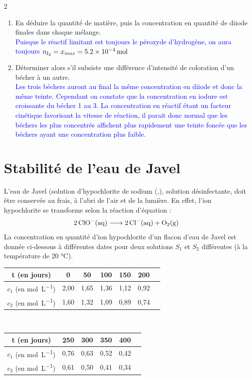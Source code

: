 \documentclass[a4paper,11pt,fleqn]{article}%
\begin{document}
\begin{multicols}{2}
\begin{enumerate}
    \textcolor{blue}{On constate que la valeur de $x_{max}$ la plus faible est toujours celle du peroxyde d'hydrogène, il sera donc le réactif limitant dans chacun des cas.}
    \item En déduire la quantité de matière, puis la concentration en quantité de diiode finales dans chaque mélange.\\
    \textcolor{blue}{Puisque le réactif limitant est toujours le péroxyde d'hydrogène, on aura toujours $n_{\ce{I2}} = x_{max} = \SI{5,2E-4}{mol}$ }
    \item Déterminer alors s'il subsiste une différence d'intensité de coloration d'un bécher à un autre.\\
    \textcolor{blue}{Les trois béchers auront au final la même concentration en diiode et donc la même teinte. Cependant on constate que la concentration en iodure est croissante du bécher 1 au 3. La concentration en réactif étant un facteur cinétique favorisant la vitesse de réaction, il parait donc normal que les béchers les plus concentrés affichent plus rapidement une teinte foncée que les béchers ayant une concentration plus faible.}
\end{enumerate}

\section{Stabilité de l'eau de Javel}
L'eau de Javel (solution d'hypochlorite de sodium (,), solution désinfectante, doit être conservée au frais, à l'abri de l'air et de la lumière. En effet, l'ion hypochlorite se transforme selon la réaction d'équation :
\begin{eqnarray}
    \ce{2ClO-(aq) -> 2Cl-(aq) + O2(g)}\nonumber
\end{eqnarray}
La concentration en quantité d'ion hypochlorite d'un flacon d'eau de Javel est donnée ci-dessous à différentes dates pour deux solutions $S_1$ et $S_2$ différentes (à la température de \num{20} \unit{\celsius}).
\\
    \begin{tabular}{|c|c|c|c|c|c|c|}
    \hline t (en jours) & 0 & 50 & 100 & 150 & 200 \\
    \hline $c_1$ (en \unit{\mole\per\liter}) & 2,00 & 1,65 & 1,36 & 1,12 & 0,92\\
    \hline $c_2$ (en \unit{\mole\per\liter}) & 1,60 & 1,32 & 1,09 & 0,89 & 0,74\\
    \hline
    \end{tabular}\\
\noindent
    \begin{tabular}{|c|c|c|c|c|c|}
    \hline t (en jours) & 250 & 300 & 350 & 400\\
    \hline $c_1$ (en \unit{\mole\per\liter}) & 0,76 & 0,63 & 0,52 & 0,42\\
    \hline $c_2$ (en \unit{\mole\per\liter}) & 0,61 & 0,50 & 0,41 & 0,34\\
    \hline
    \end{tabular}


\end{multicols}
\end{document}
